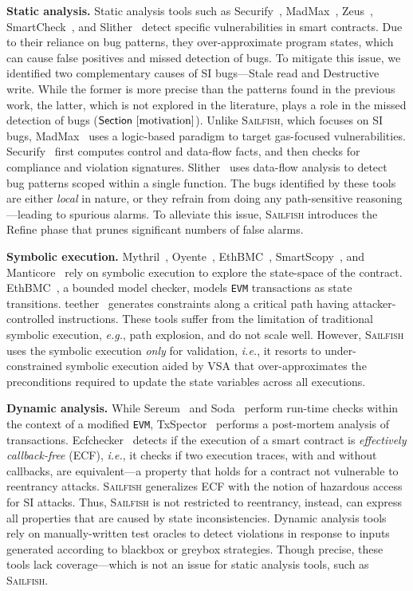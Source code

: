 \documentclass[conference, romanappendices]{tex/IEEEtran}
\theoremstyle{bfnote}
\newcommand{\toolname}{\textsc{Sailfish}\xspace}
\newcommand{\oyente}{{\sc Oyente}\xspace}
\newcommand{\teether}{{\sc teether}\xspace}
\newcommand{\refine}{{\sc Refine}\xspace}
\newcommand{\securify}{{\sc Securify}\xspace}
\newcommand{\sereum}{{\sc Sereum}\xspace}
\newcommand{\slither}{{\sc Slither}\xspace}
\newcommand{\madmax}{{\sc MadMax}\xspace}
\newcommand{\zeus}{{\sc Zeus}\xspace}
\newcommand{\manticore}{{\sc Manticore}\xspace}
\newcommand{\ethbmc}{{\sc EthBMC}\xspace}
\newcommand{\smartscopy}{{\sc SmartScopy}\xspace}
\newcommand{\smartcheck}{{\sc SmartCheck}\xspace}
\newcommand{\ecf}{{\sc Ecfchecker}\xspace}
\newcommand{\soda}{{\sc Soda}\xspace}
\newcommand{\txspector}{{\sc TxSpector}\xspace}
\newcommand{\smart}{smart contract}
\newcommand{\reentrancy}{{reentrancy}\xspace}
\newcommand{\haz}{{hazardous access}\xspace}
\newcommand{\mythril}{{\sc Mythril}\xspace}
\newcommand{\eg}{\textit{e.g.}}
\newcommand{\ie}{\textit{i.e.}}
\newcommand{\Sect}[1]{\ensuremath{\sf Section~\ref{#1}}}
\begin{document}
\noindent
\textbf{Static analysis.}
Static analysis tools such as \securify~\cite{securify}, \madmax~\cite{madmax}, \zeus~\cite{zeus}, \smartcheck~\cite{smartcheck}, and \slither~\cite{slither} detect specific vulnerabilities in smart contracts.
Due to their reliance on bug patterns, they over-approximate program states, which can cause false positives and missed detection of bugs.
To mitigate this issue, we identified two complementary causes of SI bugs---Stale read and Destructive write.
While the former is more precise than the patterns found in the previous work, the latter, which is not explored in the literature, plays a role in the missed detection of bugs (\Sect{motivation}).
Unlike \toolname, which focuses on SI bugs, \madmax~\cite{madmax} uses a logic-based paradigm to target gas-focused vulnerabilities.
\securify~\cite{securify} first computes control and data-flow facts, and then checks for compliance and violation signatures.
\slither~\cite{slither} uses data-flow analysis to detect bug patterns scoped within a single function.
The bugs identified by these tools are either \textit{local} in nature, or they {refrain\EndAccSupp{}} from doing any path-sensitive reasoning---leading to spurious alarms.
To alleviate this issue, \toolname introduces the \refine{} phase that prunes significant numbers of false alarms.


\noindent
\textbf{Symbolic execution.}
\mythril~\cite{mythril}, \oyente~\cite{oyente}, \ethbmc~\cite{ethbmc}, \smartscopy~\cite{smartscopy}, and \manticore~\cite{manticore} rely on symbolic execution to explore the state-space of the contract.
\ethbmc~\cite{ethbmc}, a bounded model checker, models \texttt{EVM} transactions as state transitions.
\teether~\cite{teether} generates constraints along a critical path having attacker-controlled instructions.
These tools suffer from the limitation of traditional symbolic execution, \eg, path explosion, and do not scale well.
However, \toolname{} uses the symbolic execution \textit{only} for validation, \ie, 
it resorts to under-constrained symbolic execution aided by VSA that over-approximates the preconditions required to update the state variables 
across all executions.


\noindent
\textbf{Dynamic analysis.}
While \sereum~\cite{sereum} and \soda~\cite{soda} perform run-time checks within the context of a modified \texttt{EVM}, \txspector~\cite{txspector} performs a post-mortem analysis of transactions.
\ecf~\cite{ecf} detects if the execution of a \smart{} is \textit{effectively callback-free} (ECF), \ie, it checks if two execution traces, with and without callbacks, are equivalent---a property that holds for a contract not vulnerable to \reentrancy attacks.
\toolname generalizes ECF with the notion of \haz for SI attacks.
Thus, \toolname is not restricted to \reentrancy, instead, can express all properties that are caused by state inconsistencies.
Dynamic analysis tools~\cite{contractfuzzer, harvey, bran, echidna, sfuzz}
rely on manually-written test oracles to detect violations in response to inputs generated according to blackbox or greybox strategies.
Though precise, these tools lack coverage---which is not an issue for static analysis tools, such as \toolname.
\end{document}
